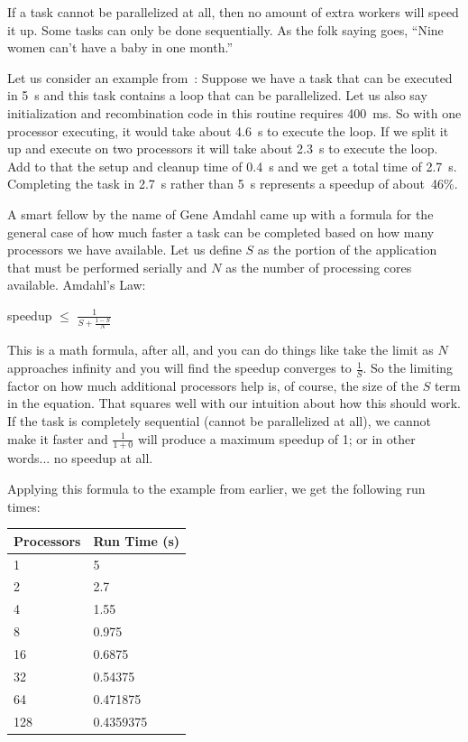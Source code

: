 If a task cannot be parallelized at all, then no amount of extra workers will speed it up. Some tasks can only be done sequentially. As the folk saying goes, ``Nine women can't have a baby in one month.''

Let us consider an example from~\cite{mte241}: Suppose we have a task that can be executed in 5~s and this task contains a loop that can be parallelized. Let us also say initialization and recombination code in this routine requires 400~ms. So with one processor executing, it would take about 4.6~s to execute the loop. If we split it up and execute on two processors it will take about 2.3~s to execute the loop. Add to that the setup and cleanup time of 0.4~s and we get a total time of 2.7~s. Completing the task in 2.7~s rather than 5~s represents a speedup of about~46\%.

A smart fellow by the name of Gene Amdahl came up with a formula for the general case of how much faster a task can be completed based on how many processors we have available. Let us define $S$ as the portion of the application that must be performed serially and $N$ as the number of processing cores available. Amdahl's Law:

\begin{center}
speedup $\leq$ {\huge $\frac{1}{S + \frac{1-S}{N}}$}
\end{center}

This is a math formula, after all, and you can do things like take the limit as $N$ approaches infinity and you will find the speedup converges to $\frac{1}{S}$. So the limiting factor on how much additional processors help is, of course, the size of the $S$ term in the equation. That squares well with our intuition about how this should work. If the task is completely sequential (cannot be parallelized at all), we cannot make it faster and $\frac{1}{1 + 0}$ will produce a maximum speedup of 1; or in other words... no speedup at all.

Applying this formula to the example from earlier, we get the following run times:

\begin{center}
	\begin{tabular}{l|l}
	\textbf{Processors} & \textbf{Run Time (s)} \\ \hline
	1 & 5\\
	2 & 2.7\\
	4 & 1.55\\
	8 & 0.975\\
	16 & 0.6875 \\
	32 & 0.54375 \\
	64 & 0.471875 \\
	128 & 0.4359375\\
	\end{tabular}
\end{center}

